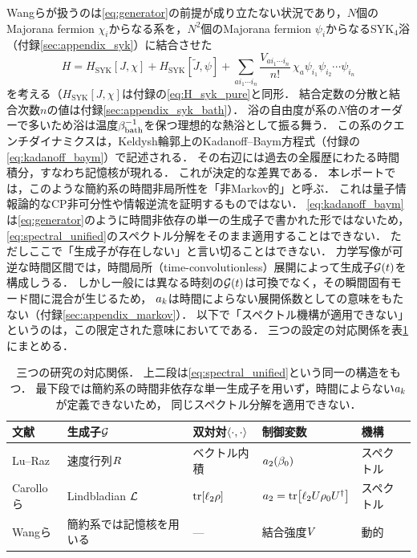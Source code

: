 \documentclass[a4paper,11pt,onecolumn,baselineskip=14.5pt]{jlreq}
\begin{document}
Wangら\cite{Wang2024}が扱うのは\eqref{eq:generator}の前提が成り立たない状況であり，$N$個のMajorana fermion $\chi_i$からなる系を，$N^2$個のMajorana fermion $\psi_i$からなるSYK$_4$浴（付録\ref{sec:appendix_syk}）に結合させた
\begin{equation}
  H = H_{\mathrm{SYK}}[J,\chi] + H_{\mathrm{SYK}}[\tilde{J},\psi]
    + \sum_{a i_1\cdots i_n}\frac{V_{a i_1 \cdots i_n}}{n!}\,
      \chi_a \psi_{i_1}\psi_{i_2}\cdots\psi_{i_n}
  \label{eq:H_coupled}
\end{equation}
を考える（$H_{\mathrm{SYK}}[J,\chi]$は付録の\eqref{eq:H_syk_pure}と同形．
結合定数の分散と結合次数$n$の値は付録\ref{sec:appendix_syk_bath}）．
浴の自由度が系の$N$倍のオーダーで多いため浴は温度$\beta_{\mathrm{bath}}^{-1}$を保つ理想的な熱浴として振る舞う．
この系のクエンチダイナミクスは，Keldysh輪郭上のKadanoff--Baym方程式（付録の\eqref{eq:kadanoff_baym}）で記述される．
その右辺には過去の全履歴にわたる時間積分，すなわち記憶核が現れる．
これが決定的な差異である．
本レポートでは，このような簡約系の時間非局所性を「非Markov的」と呼ぶ．
これは量子情報論的なCP非可分性や情報逆流を証明するものではない．
\eqref{eq:kadanoff_baym}は\eqref{eq:generator}のように時間非依存の単一の生成子で書かれた形ではないため，
\eqref{eq:spectral_unified}のスペクトル分解をそのまま適用することはできない．
ただしここで「生成子が存在しない」と言い切ることはできない．
力学写像が可逆な時間区間では，時間局所（time-convolutionless）展開によって生成子$\mathcal{G}(t)$を構成しうる．
しかし一般には異なる時刻の$\mathcal{G}(t)$は可換でなく，その瞬間固有モード間に混合が生じるため，
$a_{k}$は時間によらない展開係数としての意味をもたない（付録\ref{sec:appendix_markov}）．
以下で「スペクトル機構が適用できない」というのは，この限定された意味においてである．
三つの設定の対応関係を表\ref{tab:unification}にまとめる．

\begin{table}[htbp]
  \centering
  \caption{三つの研究の対応関係．
           上二段は\eqref{eq:spectral_unified}という同一の構造をもつ．
           最下段では簡約系の時間非依存な単一生成子を用いず，時間によらない$a_{k}$が定義できないため，
           同じスペクトル分解を適用できない．}
  \label{tab:unification}
  \small
  \begin{tabular}{@{}lllll@{}}
    \toprule
    文献 & 生成子$\mathcal{G}$ & 双対対$\langle \cdot , \cdot \rangle$ & 制御変数 & 機構 \\
    \midrule
    Lu--Raz\cite{Lu2017}
      & 速度行列$R$ & ベクトル内積
      & $a_{2}(\beta_{0})$ & スペクトル \\
    Carolloら\cite{Carollo2021}
      & Lindbladian $\mathcal{L}$ & $\tr[\ell_{2}\rho]$
      & $a_{2}=\tr[\ell_{2}U\rho_0 U^{\dagger}]$ & スペクトル \\
    Wangら\cite{Wang2024}
      & 簡約系では記憶核を用いる & ---
      & 結合強度$V$ & 動的 \\
    \bottomrule
  \end{tabular}
\end{table}
\end{document}

